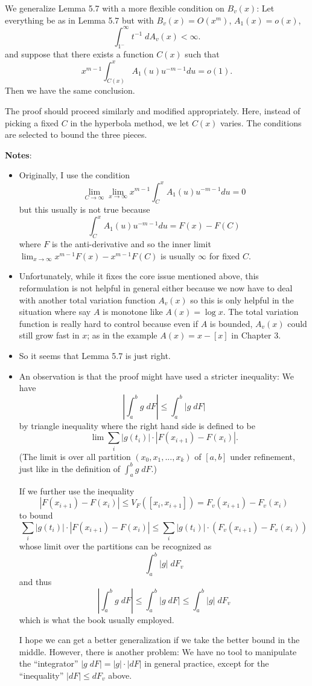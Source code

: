 \documentclass[12pt]{article}
\newcommand{\Abs}[1]{\left| #1 \right|}
\begin{document}
\fi

We generalize Lemma 5.7 with a more flexible condition on $B_v(x)$: Let everything be as in Lemma 5.7 but with $B_v(x) = O(x^m)$, $A_1(x) = o(x)$,
$$\int_{1^-}^{\infty} t^{-1} \; dA_v(x) < \infty.$$
and suppose that there exists a function $C(x)$ such that
$$x^{m-1} \int_{C(x)}^x A_1(u) u^{-m-1} du = o(1).$$
Then we have the same conclusion.

The proof should proceed similarly and modified appropriately. Here, instead of picking a fixed $C$ in the hyperbola method, we let $C(x)$ varies. The conditions are selected to bound the three pieces.

\textbf{Notes}:
\begin{itemize}
\item Originally, I use the condition
$$\lim_{C \rightarrow \infty} \lim_{x \rightarrow \infty} x^{m-1} \int_{C}^x A_1(u) u^{-m-1} du = 0$$
but this usually is not true because
$$\int_{C}^x A_1(u) u^{-m-1} du = F(x) - F(C)$$
where $F$ is the anti-derivative and so the inner limit $\lim_{x \rightarrow \infty} x^{m-1} F(x) - x^{m-1} F(C)$ is usually $\infty$ for fixed $C$.
\item Unfortunately, while it fixes the core issue mentioned above, this reformulation is not helpful in general either because we now have to deal with another total variation function $A_v(x)$ so this is only helpful in the situation where say $A$ is monotone like $A(x) = \log x$. The total variation function is really hard to control because even if $A$ is bounded, $A_v(x)$ could still grow fast in $x$; as in the example $A(x) = x - [x]$ in Chapter 3.
\item So it seems that Lemma 5.7 is just right.
\item An observation is that the proof might have used a stricter inequality: We have
$$\Abs{ \int_a^b g \; dF } \leq \int_a^b |g \; dF|$$
by triangle inequality where the right hand side is defined to be
$$\lim \sum_i |g(t_i)| \cdot |F(x_{i+1}) - F(x_i)|.$$
(The limit is over all partition $(x_0, x_1, ..., x_k)$ of $[a, b]$ under refinement, just like in the definition of $\int_a^b g \; dF$.)

If we further use the inequality
$$|F(x_{i+1}) - F(x_i)| \leq V_F([x_i, x_{i+1}]) = F_v(x_{i+1}) - F_v(x_i)$$
to bound
$$\sum_i |g(t_i)| \cdot |F(x_{i+1}) - F(x_i)| \leq \sum_i |g(t_i)| \cdot (F_v(x_{i+1}) - F_v(x_i))$$
whose limit over the partitions can be recognized as
$$\int_a^b |g| \; d F_v$$
and thus
$$\Abs{ \int_a^b g \; dF } \leq \int_a^b |g \; dF| \leq \int_a^b |g| \; dF_v$$
which is what the book usually employed.

I hope we can get a better generalization if we take the better bound in the middle. However, there is another problem: We have no tool to manipulate the ``integrator'' $|g \; dF| = |g| \cdot |dF|$ in general practice, except for the ``inequality'' $|dF| \leq dF_v$ above.
\end{itemize}
\end{document}
